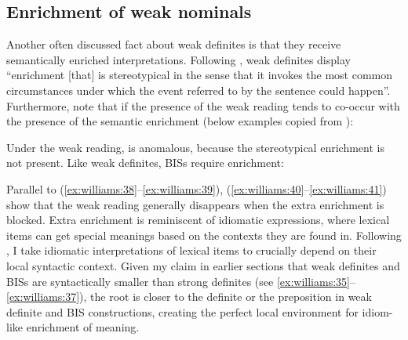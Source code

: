 \documentclass[output=paper,
modfonts
]{langscibook}
\begin{document}
\subsection{Enrichment of weak nominals}

Another often discussed fact about weak definites is that they receive semantically enriched interpretations. Following \citet[182]{Aguilar-GuevaraZwarsts2011}, weak definites display ``enrichment [that] is stereotypical in the sense that it invokes the most common circumstances under which the event referred to by the sentence could happen''. Furthermore, \citeauthor{Aguilar-GuevaraZwarsts2011} note that if the presence of the weak reading tends to co-occur with the presence of the semantic enrichment (below examples copied from \citealt[182, ex. 10b, 11b]{Aguilar-GuevaraZwarsts2011}):

\begin{exe}
\end{exe}

Under the weak reading,  is anomalous, because the stereotypical enrichment is not present. Like weak definites, BISs require enrichment:

\begin{exe}
   	
\end{exe}

Parallel to (\ref{ex:williams:38}--\ref{ex:williams:39}), (\ref{ex:williams:40}--\ref{ex:williams:41}) show that the weak reading generally disappears when the extra enrichment is blocked. Extra enrichment is  reminiscent of idiomatic expressions, where lexical items can get special meanings based on the contexts they are found in. Following \citep[208]{Marantz1997}, I take idiomatic interpretations of lexical items to crucially depend on their local syntactic context. Given my claim in earlier sections that weak definites and BISs are syntactically smaller than strong definites (see \ref{ex:williams:35}--\ref{ex:williams:37}), the root is closer to the definite or the preposition in weak definite and BIS constructions, creating the perfect local environment for idiom-like enrichment of meaning.
\end{document}
